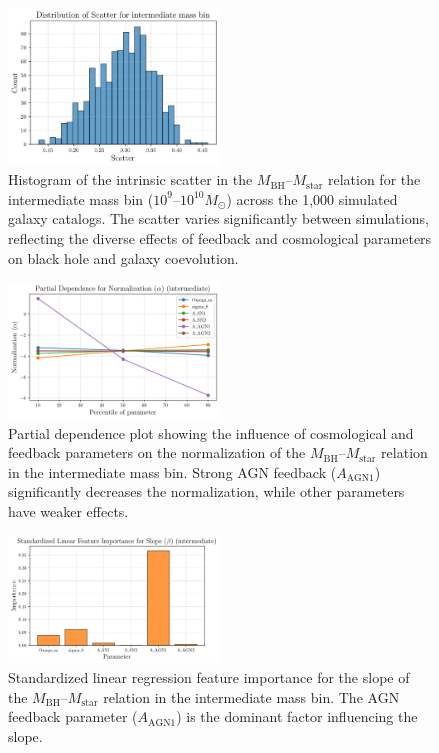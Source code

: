\documentclass[twocolumn]{aastex631}
\begin{document}
\begin{figure}[ht!]
    \centering
    \includegraphics[width=0.5\textwidth]{plots/dist_scatter_intermediate_44_20250423_182545.png}
    \caption{Histogram of the intrinsic scatter in the $M_\mathrm{BH}$--$M_\mathrm{star}$ relation for the intermediate mass bin ($10^9$--$10^{10} M_\odot$) across the 1,000 simulated galaxy catalogs. The scatter varies significantly between simulations, reflecting the diverse effects of feedback and cosmological parameters on black hole and galaxy coevolution.
}
    \label{fig:dist_scatter_intermediate}
\end{figure}

\begin{figure}[ht!]
    \centering
    \includegraphics[width=0.5\textwidth]{plots/pdp_Normalization_alpha_intermediate_74_20250423_182559.png}
    \caption{Partial dependence plot showing the influence of cosmological and feedback parameters on the normalization of the $M_\mathrm{BH}$--$M_\mathrm{star}$ relation in the intermediate mass bin. Strong AGN feedback ($A_\mathrm{AGN1}$) significantly decreases the normalization, while other parameters have weaker effects.
}
    \label{fig:pdp_norm_intermediate}
\end{figure}

\begin{figure}[ht!]
    \centering
    \includegraphics[width=0.5\textwidth]{plots/featimp_StandardizedLinear_Slope_beta_intermediate_70_20250423_182558.png}
    \caption{Standardized linear regression feature importance for the slope of the $M_\mathrm{BH}$--$M_\mathrm{star}$ relation in the intermediate mass bin. The AGN feedback parameter ($A_\mathrm{AGN1}$) is the dominant factor influencing the slope.
}
    \label{fig:featimp_slope_linear_intermediate}
\end{figure}
\end{document}
